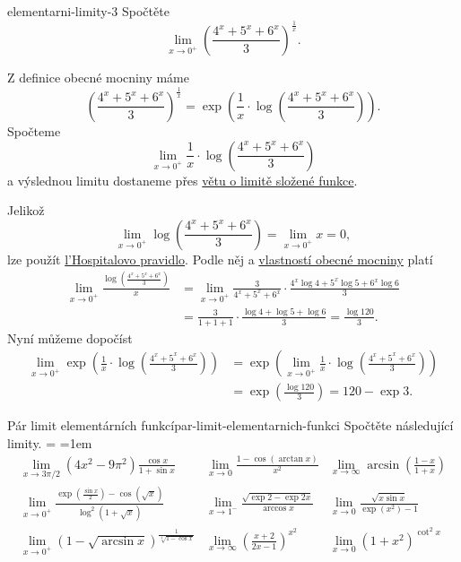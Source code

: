 \begin{problem}{}{elementarni-limity-3}
 Spočtěte
 \[
  \lim_{x \to 0^{+}} \left( \frac{4^{x} + 5^{x} + 6^{x}}{3}
  \right)^{\frac{1}{x}}.
 \]
\end{problem}
\begin{probsol}
 Z definice obecné mocniny máme
 \[
  \left( \frac{4^{x} + 5^{x} + 6^{x}}{3} \right)^{\frac{1}{x}} = \exp \left(
  \frac{1}{x} \cdot \log \left( \frac{4^{x} + 5^{x} + 6^{x}}{3} \right)
 \right).
 \]
 Spočteme
 \[
  \lim_{x \to 0^{+}} \frac{1}{x} \cdot \log \left( \frac{4^{x} + 5^{x} +
  6^{x}}{3} \right)
 \]
 a výslednou limitu dostaneme přes \hyperref[thm:limita-slozene-funkce]{větu o
 limitě složené funkce}.

 Jelikož
 \[
  \lim_{x \to 0^{+}} \log \left( \frac{4^{x} + 5^{x} + 6^{x}}{3} \right) =
  \lim_{x \to 0^{+}} x = 0,
 \]
 lze použít \hyperref[thm:lhospitalovo-pravidlo]{l'Hospitalovo pravidlo}. Podle
 něj a \hyperref[prop:vlastnosti-obecne-mocniny]{vlastností obecné mocniny}
 platí
 \begin{align*}
  \lim_{x \to 0^{+}} \frac{\log \left( \frac{4^{x} + 5^{x} + 6^{x}}{3}
  \right)}{x} &= \lim_{x \to 0^{+}} \frac{3}{4^{x} + 5^{x} + 6^{x}} \cdot
  \frac{4^{x} \log 4 + 5^{x} \log 5 + 6^{x} \log 6}{3}\\
              &= \frac{3}{1 + 1 + 1} \cdot \frac{\log 4 + \log 5 + \log 6}{3} =
              \frac{\log 120}{3}.
 \end{align*}
 Nyní můžeme dopočíst
 \begin{align*}
  \lim_{x \to 0^{+}} \exp \left( \frac{1}{x} \cdot \log \left( \frac{4^{x} +
   5^{x} + 6^{x}}{3} \right) \right) &= \exp \left( \lim_{x \to 0^{+}}
 \frac{1}{x} \cdot \log \left( \frac{4^{x} + 5^{x} + 6^{x}}{3} \right) \right)\\
                                     &= \exp \left( \frac{\log 120}{3} \right) =
                                     120 - \exp 3.
 \end{align*}
\end{probsol}

\begin{exercise}{Pár limit elementárních funkcí}{par-limit-elementarnich-funkci}
 Spočtěte následující limity.
 {\everymath={\displaystyle}
  \arraycolsep=1em
  \[
   \begin{array}{lll}
    \lim_{x \to 3 \pi / 2} (4x^2 - 9\pi^2) \frac{\cos x}{1 + \sin x} & \lim_{x
    \to 0} \frac{1 - \cos(\arctan x)}{x^2} & \lim_{x \to \infty} \arcsin \left(
    \frac{1-x}{1+x}\right)\\[2em]
    \lim_{x \to 0^{+}} \frac{\exp \left( \frac{\sin x}{2} \right) - \cos
    (\sqrt{x})}{\log^2(1 + \sqrt{x})} & \lim_{x \to 1^{-}} \frac{\sqrt{\exp 2 -
   \exp 2x}}{\arccos x} & \lim_{x \to 0} \frac{\sqrt{x \sin x}}{\exp(x^2) -
   1}\\[2em]
   \lim_{x \to 0^{+}} \left( 1 - \sqrt{\arcsin x} \right)^{\frac{1}{\sqrt[4]{1 -
 \cos x}}} & \lim_{x \to \infty} \left( \frac{x+2}{2x-1} \right)^{x^2} & \lim_{x
 \to 0} (1 + x^2)^{\cot^2 x}
   \end{array}
  \]
 }
\end{exercise}
